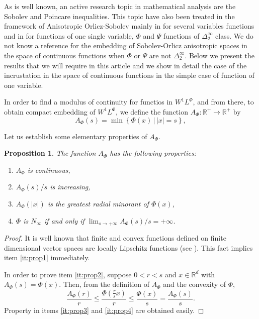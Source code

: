 \documentclass[twoside]{article}
\newtheorem{prop}[thm]{Proposition}
\theoremstyle{remark}
\newcommand{\lphi}{L^{\Phi}}
\newcommand{\wphi}{W^{1}\lphi}
\newcommand{\rr}{\mathbb{R}}
\renewcommand{\leq}{\leqslant}
\begin{document}
As is well known, an active research topic in mathematical analysis are the Sobolev and Poincare inequalities. This topic have also been treated in the framework of Anisotropic Orlicz-Sobolev mainly in \cite{cianchi2000fully,cianchi2004optimal,trudinger1974imbedding} for several variables functions and in \cite{chamra2017anisotropic} for functions of one single variable, $\Phi$ and $\Psi$ functions of $\Delta_2^{\infty}$ class.   We do not know a reference for the embedding of Sobolev-Orlicz anisotropic spaces in the space of continuous functions when $\Phi$ or $\Psi$ are not $\Delta_2^{\infty}$. Below we present the results that we will require in this article and we show in detail the case of the incrustation in the space of continuous functions in the simple case of function of one variable.

In order to find a modulus of continuity for functios in $\wphi$, and from there, to obtain compact embedding of $\wphi$, we define the function $A_{\Phi}:\rr^+\to\rr^+$ by
\begin{equation}\label{eq:inversa-gral}
A_{\Phi}(s)=\min\left\{\Phi(x)\,\big|\,|x|=s\right\},
\end{equation}

Let us establish some elementary properties of $A_{\Phi}$.
\begin{prop}\label{prop:AsubPhi} The function $A_{\Phi}$ has the following properties:
\begin{enumerate}
 \item\label{it:prop1} $A_{\Phi}$ is continuous,
 \item\label{it:prop2} $A_{\Phi}(s)/s$ is increasing,
 \item\label{it:prop3} $A_{\Phi}(|x|)$ is the \emph{greatest radial minorant} of 
 $\Phi(x)$,
 \item\label{it:prop4} $\Phi$ is $N_{\infty}$ if and only if $\lim_{s\to+\infty} A_{\Phi}(s)/s=+\infty$.
\end{enumerate}
\end{prop}

\begin{proof} It is well known that finite and convex functions defined on finite dimensional 
vector spaces are locally Lipschitz functions (see \cite{clarke2013functional}). This fact 
implies item \ref{it:prop1} immediately. 

In order to prove item \ref{it:prop2}, suppose $0<r<s$ and $x\in\rr^d$ with $A_{\Phi}(s)
=\Phi(x)$. Then, from the definition of $A_{\Phi}$ and the convexity of $\Phi$,
\[\frac{A_{\Phi}(r)}{r}\leq \frac{\Phi\left(\frac{r}{s}x\right)}{r}\leq \frac{\Phi\left(x\right)}{s}=
 \frac{A_{\Phi}(s)}{s}.
\]
Property in items \ref{it:prop3} and \ref{it:prop4} are obtained easily.

 
\end{proof}
\end{document}
